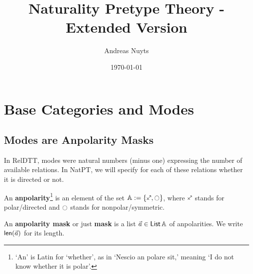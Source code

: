 \documentclass[a4paper]{article}
\newcommand{\thetitle}{Naturality Pretype Theory - Extended Version}
\newcommand{\theauthors}{Andreas Nuyts}
\begin{document}
	\addtolength{\voffset}{-.5in}

\title{\thetitle}
\date{\today}
\author{\theauthors{}}
\maketitle

\tableofcontents

\pagebreak

\section{Base Categories and Modes}

\subsection{Modes are Anpolarity Masks}
In RelDTT, modes were natural numbers (minus one) expressing the number of available relations.
In NatPT, we will specify for each of these relations whether it is directed or not.
\begin{definition} \label{def:anpolarity}
	An \textbf{anpolarity}\footnote{`An' is Latin for `whether', as in `Nescio an polare sit,' meaning `I do not know whether it is polar'.} is an element of the set $\Anpolarity := \accol{\ypolar, \npolar}$, where $\ypolar$ stands for polar/directed and $\npolar$ stands for nonpolar/symmetric.
	
	An \textbf{anpolarity mask} or just \textbf{mask} is a list $\vec a \in {\mathsf{List}}\,{\mathbb{A}}$ of anpolarities. We write $\mathsf{len}(\vec a)$ for its length.
\end{definition}
\end{document}
